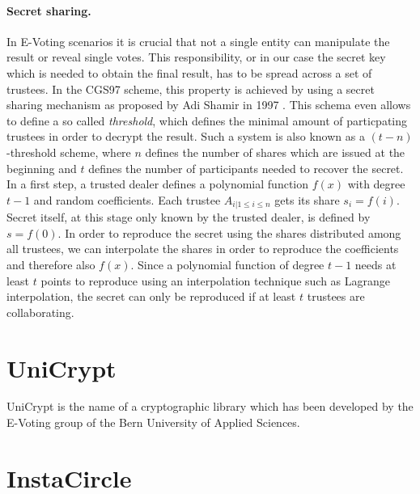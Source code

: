 \documentclass[numbers=noenddot, abstract=on]{scrreprt}
\begin{document}
\paragraph{Secret sharing.} In E-Voting scenarios it is crucial that not a
single entity can manipulate the result or reveal single votes. This
responsibility, or in our case the secret key which is needed to obtain the
final result, has to be spread across a set of trustees. In the CGS97 scheme,
this property is achieved by using a secret sharing mechanism as proposed by Adi
Shamir in 1997 \cite{SHA79}. This schema even allows to define a so called
\textit{threshold}, which defines the minimal amount of particpating trustees in
order to decrypt the result. Such a system is also known as a
$(t-n)$-threshold scheme, where $n$ defines the number of shares which are
issued at the beginning and $t$ defines the number of participants needed to
recover the secret. In a first step, a trusted dealer defines a polynomial
function $f(x)$ with degree $t-1$ and random coefficients. Each trustee $A_{i |
1 \leq i \leq n}$ gets its share $s_i=f(i)$. Secret itself, at this stage only
known by the trusted dealer, is defined by $s=f(0)$. In order to reproduce the
secret using the shares distributed among all trustees, we can interpolate the
shares in order to reproduce the coefficients and therefore also $f(x)$. Since a
polynomial function of degree $t-1$ needs at least $t$ points to reproduce using
an interpolation technique such as Lagrange interpolation, the secret can only
be reproduced if at least $t$ trustees are collaborating. 

\section{UniCrypt}
UniCrypt is the name of a cryptographic library which has been developed by the
E-Voting group of the Bern University of Applied Sciences.

\section{InstaCircle}

\printbibliography
\end{document}

